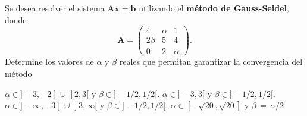 \begin{pregunta}
\begin{cuerpo}
Se desea resolver el sistema $\boldsymbol{A} \boldsymbol{x} = \boldsymbol{b}$ utilizando el \textbf{m\'etodo de Gauss-Seidel}, donde
\begin{equation*}
\boldsymbol{A} = \begin{pmatrix}
  4          & \alpha & 1 \\
  2\beta  & 5           &4\\
  0			 &2 		 &\alpha
\end{pmatrix}.
\end{equation*}
Determine los valores de $\alpha$ y $\beta$ reales que permitan garantizar la convergencia del m\'etodo
\end{cuerpo}
\begin{alternativas}
{$\alpha \in ]-3,-2[ \,\cup \,]2,3[$ y $\beta \in ]-1/2,1/2[$.} %
{$\alpha \in ]-3,3[ $ y $\beta \in ]-1/2,1/2[$.}
{$\alpha \in ]-\infty,-3[ \,\cup \,]3,\infty[$ y $\beta \in ]-1/2,1/2[$.} 
{$\alpha \in [-\sqrt{20},\sqrt{20}]$ y $\beta\,=\,\alpha/2$}
\end{alternativas}
\justificacion{7cm}
\end{pregunta}
